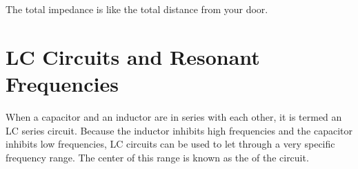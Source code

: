 The total impedance is like the total distance from your door.

\section{LC Circuits and Resonant Frequencies}

When a capacitor and an inductor are in series with each other, it is termed an LC series circuit.
Because the inductor inhibits high frequencies and the capacitor inhibits low frequencies, LC circuits can be used to let through a very specific frequency range.
The center of this range is known as the  of the circuit.




